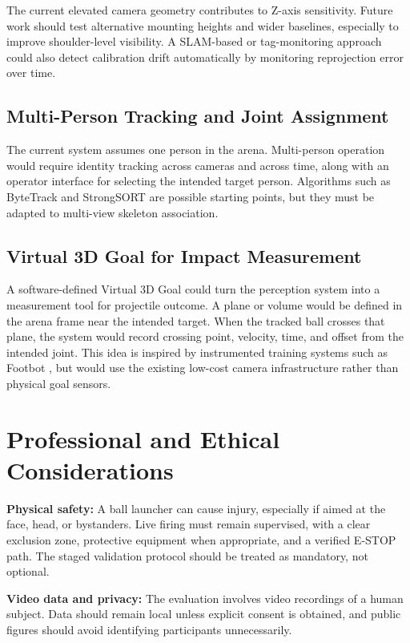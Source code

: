 The current elevated camera geometry contributes to Z-axis sensitivity. Future work should test alternative mounting heights and wider baselines, especially to improve shoulder-level visibility. A SLAM-based or tag-monitoring approach \cite{ref36} could also detect calibration drift automatically by monitoring reprojection error over time.

\subsection{Multi-Person Tracking and Joint Assignment}

The current system assumes one person in the arena. Multi-person operation would require identity tracking across cameras and across time, along with an operator interface for selecting the intended target person. Algorithms such as ByteTrack \cite{ref33} and StrongSORT \cite{ref34} are possible starting points, but they must be adapted to multi-view skeleton association.

\subsection{Virtual 3D Goal for Impact Measurement}

A software-defined Virtual 3D Goal could turn the perception system into a measurement tool for projectile outcome. A plane or volume would be defined in the arena frame near the intended target. When the tracked ball crosses that plane, the system would record crossing point, velocity, time, and offset from the intended joint. This idea is inspired by instrumented training systems such as Footbot \cite{ref35}, but would use the existing low-cost camera infrastructure rather than physical goal sensors.

\section{Professional and Ethical Considerations}

\textbf{Physical safety:} A ball launcher can cause injury, especially if aimed at the face, head, or bystanders. Live firing must remain supervised, with a clear exclusion zone, protective equipment when appropriate, and a verified E-STOP path. The staged validation protocol should be treated as mandatory, not optional.

\textbf{Video data and privacy:} The evaluation involves video recordings of a human subject. Data should remain local unless explicit consent is obtained, and public figures should avoid identifying participants unnecessarily.

